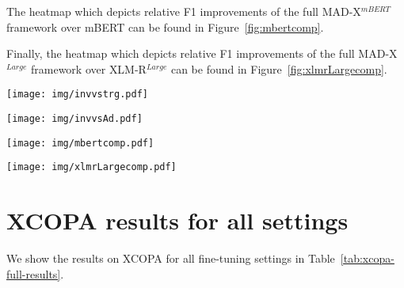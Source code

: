 \documentclass[11pt,a4paper]{article}
\newcommand{\model}[1]{\textsc{MAD-X}}
\newcommand{\xlmr}[1]{\textsc{XLM-R}}
\newcommand{\mlmtrg}[1]{\textsc{XLM-R$^{Base}$ MLM-trg}}
\begin{document}
The heatmap which depicts relative F1 improvements of the full \model{}$^{mBERT}$ framework   over mBERT can be found in Figure~\ref{fig:mbertcomp}.


Finally, the heatmap which depicts relative F1 improvements of the full \model{}$^{Large}$ framework   over \xlmr{}$^{Large}$ can be found in Figure~\ref{fig:xlmrLargecomp}.


 \begin{figure*}[b] \centering
\texttt{[image: img/invvstrg.pdf]}
\caption{Relative $F_1$ improvement of \model{}$^{Base}$ over \mlmtrg{} in cross-lingual NER transfer.}
\label{fig:invvstrg}
\end{figure*}

 \begin{figure*}[b] \centering
\texttt{[image: img/invvsAd.pdf]}
\caption{Relative $F_1$ improvement of \model{}$^{Base}$ over \model{}$^{Base}$ --\textsc{inv} in cross-lingual NER transfer.}
\label{fig:invvsAd}
\end{figure*}


 \begin{figure*}[b] \centering
\texttt{[image: img/mbertcomp.pdf]}
\caption{Relative $F_1$ improvement of \model{}$^{mBERT}$ over mBERT in cross-lingual NER transfer.}
\label{fig:mbertcomp}
\end{figure*}

 \begin{figure*}[b] \centering
\texttt{[image: img/xlmrLargecomp.pdf]}
\caption{Relative $F_1$ improvement of \model{}$^{Large}$ over XLM-R$^{Large}$ in cross-lingual NER transfer.}
\label{fig:xlmrLargecomp}
\end{figure*}


\section{XCOPA results for all settings}
\label{s:xcopa-all-results}

We show the results on XCOPA for all fine-tuning settings in Table~\ref{tab:xcopa-full-results}.
\end{document}

